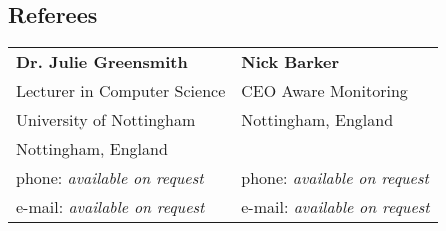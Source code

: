 \documentclass[margin,line]{resume}
\begin{document}
\begin{resume}
\section{\mysidestyle Referees} 

\begin{tabular}{@{}p{6cm}p{6cm}}
\textbf{Dr. Julie Greensmith}       &  \textbf{Nick Barker}                   \\
Lecturer in Computer Science			  &  CEO Aware Monitoring                       \\
University of Nottingham                &  Nottingham, England                      \\
Nottingham, England                     &          \\
phone: \textsl{available on request}    &  phone: \textsl{available on request}     \\
e-mail: \textsl{available on request}   &  e-mail: \textsl{available on request}    \\
\end{tabular}



\end{resume}
\end{document}

